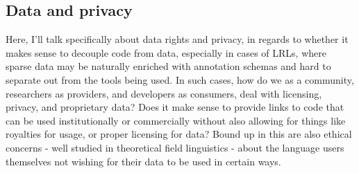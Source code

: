 %
%

\subsection{Data and privacy}
\label{subsec:data-and-privacy}

Here, I'll talk specifically about data rights and privacy, in regards to whether it makes sense to decouple code from data, especially in cases of LRLs, where sparse data may be naturally enriched with annotation schemas and hard to separate out from the tools being used. In such cases, how do we as a community, researchers as providers, and developers as consumers, deal with licensing, privacy, and proprietary data? Does it make sense to provide links to code that can be used institutionally or commercially without also allowing for things like royalties for usage, or proper licensing for data? Bound up in this are also ethical concerns - well studied in theoretical field linguistics - about the language users themselves not wishing for their data to be used in certain ways.






